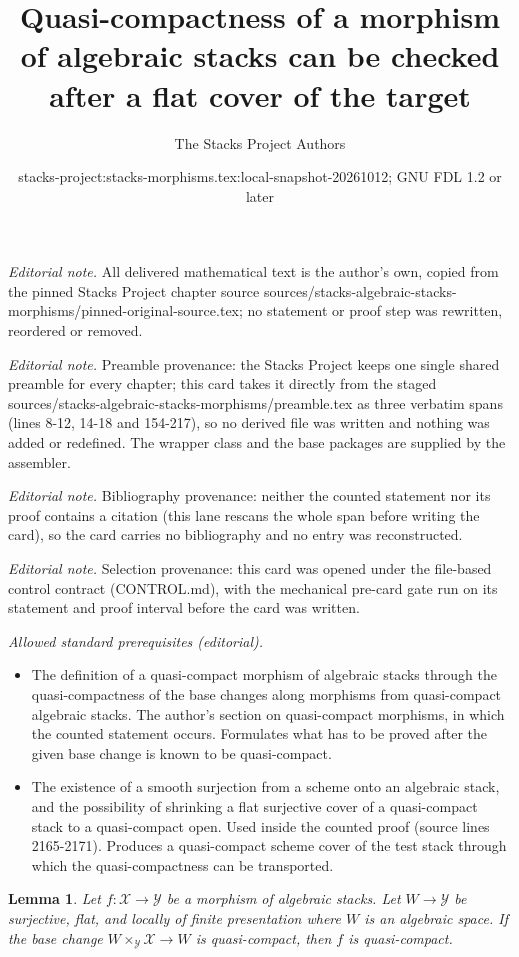 \documentclass[10pt,a4paper]{amsart}
\title{Quasi-compactness of a morphism of algebraic stacks can be checked after a flat cover of the target}
\author{The Stacks Project Authors}
\date{stacks-project:stacks-morphisms.tex:local-snapshot-20261012; GNU FDL 1.2 or later}
\theoremstyle{plain}
\newtheorem{lemma}[subsection]{Lemma}
\theoremstyle{definition}
\theoremstyle{remark}
\numberwithin{equation}{subsection}
\begin{document}
\maketitle
\noindent\textit{Editorial note.} All delivered mathematical text is the author's own, copied from the pinned Stacks Project chapter source sources/stacks-algebraic-stacks-morphisms/pinned-original-source.tex; no statement or proof step was rewritten, reordered or removed.\par\medskip
\noindent\textit{Editorial note.} Preamble provenance: the Stacks Project keeps one single shared preamble for every chapter; this card takes it directly from the staged sources/stacks-algebraic-stacks-morphisms/preamble.tex as three verbatim spans (lines 8-12, 14-18 and 154-217), so no derived file was written and nothing was added or redefined. The wrapper class and the base packages are supplied by the assembler.\par\medskip
\noindent\textit{Editorial note.} Bibliography provenance: neither the counted statement nor its proof contains a citation (this lane rescans the whole span before writing the card), so the card carries no bibliography and no entry was reconstructed.\par\medskip
\noindent\textit{Editorial note.} Selection provenance: this card was opened under the file-based control contract (CONTROL.md), with the mechanical pre-card gate run on its statement and proof interval before the card was written.\par\medskip
\noindent\textit{Allowed standard prerequisites (editorial).}\begin{itemize}
\item The definition of a quasi-compact morphism of algebraic stacks through the quasi-compactness of the base changes along morphisms from quasi-compact algebraic stacks. The author's section on quasi-compact morphisms, in which the counted statement occurs. Formulates what has to be proved after the given base change is known to be quasi-compact.
\item The existence of a smooth surjection from a scheme onto an algebraic stack, and the possibility of shrinking a flat surjective cover of a quasi-compact stack to a quasi-compact open. Used inside the counted proof (source lines 2165-2171). Produces a quasi-compact scheme cover of the test stack through which the quasi-compactness can be transported.
\end{itemize}\medskip
\begin{lemma}
\label{lemma-check-quasi-compact-covering}
Let $f : \mathcal{X} \to \mathcal{Y}$ be a morphism of algebraic stacks.
Let $W \to \mathcal{Y}$ be surjective, flat, and locally of finite
presentation where $W$ is an algebraic space. If the base change
$W \times_\mathcal{Y} \mathcal{X} \to W$ is quasi-compact, then
$f$ is quasi-compact.
\end{lemma}
\end{document}
